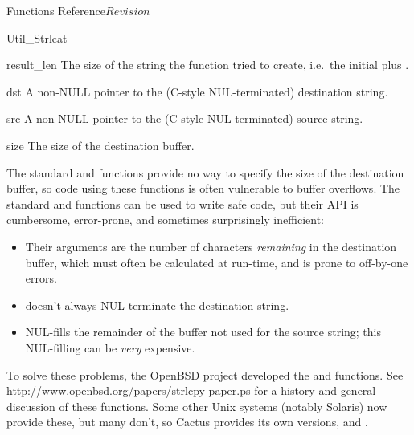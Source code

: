 \begin{cactuspart}{ Functions Reference}{}{$Revision$}
\begin{FunctionDescription}{Util\_Strlcat}
\begin{ResultSection}
\begin{Result}{result\_len}
The size of the string the function tried to create, i.e.\
the initial  plus .
\end{Result}
\end{ResultSection}

\begin{ParameterSection}
\begin{Parameter}{dst}
A non-NULL pointer to the (C-style NUL-terminated) destination string.
\end{Parameter}
\begin{Parameter}{src}
A non-NULL pointer to the (C-style NUL-terminated) source string.
\end{Parameter}
\begin{Parameter}{size}
The size of the destination buffer.
\end{Parameter}
\end{ParameterSection}

\begin{Discussion}
The standard  and  functions provide
no way to specify the size of the destination buffer, so code using
these functions is often vulnerable to buffer overflows.  The standard
\code{strncat()} and \code{strncpy()} functions can be used to write
safe code, but their API is cumbersome, error-prone, and sometimes
surprisingly inefficient:
\begin{itemize}
\item	Their  arguments are the number of characters
	{\em remaining\/} in the destination buffer, which must
	often be calculated at run-time, and is prone to off-by-one
	errors.
\item	{} doesn't always NUL-terminate the destination string.
\item	\code{strncpy()} NUL-fills the remainder of the buffer not
	used for the source string; this NUL-filling can be {\em very\/}
	expensive.
\end{itemize}

To solve these problems, the OpenBSD project developed the
 and  functions.  See
\url{http://www.openbsd.org/papers/strlcpy-paper.ps}
for a history and general discussion of these functions.
Some other Unix systems (notably Solaris) now provide these,
but many don't, so Cactus provides its own versions,
 and .


\end{Discussion}
\end{FunctionDescription}
\end{cactuspart}
